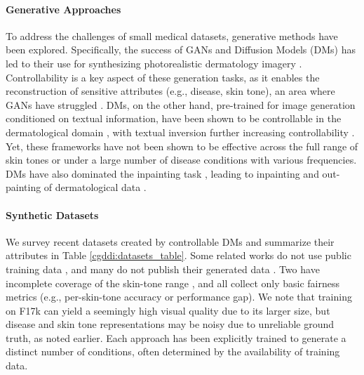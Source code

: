 \documentclass[11pt]{ucthesis}
\begin{document}
\paragraph{Generative Approaches} To address the challenges of small medical datasets, generative methods have been explored. Specifically, the success of GANs \cite{goodfellow-2020} and Diffusion Models (DMs) \cite{dhariwal_2021_diffusion} has led to their use for synthesizing photorealistic dermatology imagery \cite{wang-2024}. Controllability is a key aspect of these generation tasks, as it enables the reconstruction of sensitive attributes (e.g., disease, skin tone), an area where GANs have struggled \cite{qin-2020}. DMs, on the other hand, pre-trained for image generation conditioned on textual information, have been shown to be controllable in the dermatological domain \cite{sagers-2023}, with textual inversion \cite{gal2023an} further increasing controllability \cite{wang-2024}. Yet, these frameworks have not been shown to be effective across the full range of skin tones or under a large number of disease conditions with various frequencies. DMs have also dominated the inpainting task \cite{razzhigaev-2023}, leading to inpainting and out-painting of dermatological data \cite{sagers-2023}.

\paragraph{Synthetic Datasets} We survey recent datasets created by controllable DMs and summarize their attributes in Table \ref{cgddi:datasets_table}. Some related works do not use public training data \cite{ktena-2024}, and many do not publish their generated data \cite{wang-2024}. Two have incomplete coverage of the skin-tone range \cite{ktena-2024}, and all collect only basic fairness metrics (e.g., per-skin-tone accuracy or performance gap). We note that training on F17k \cite{groh_2021_evaluating} can yield a seemingly high visual quality due to its larger size, but disease and skin tone representations may be noisy due to unreliable ground truth, as noted earlier. Each approach has been explicitly trained to generate a distinct number of conditions, often determined by the availability of training data.
\end{document}
